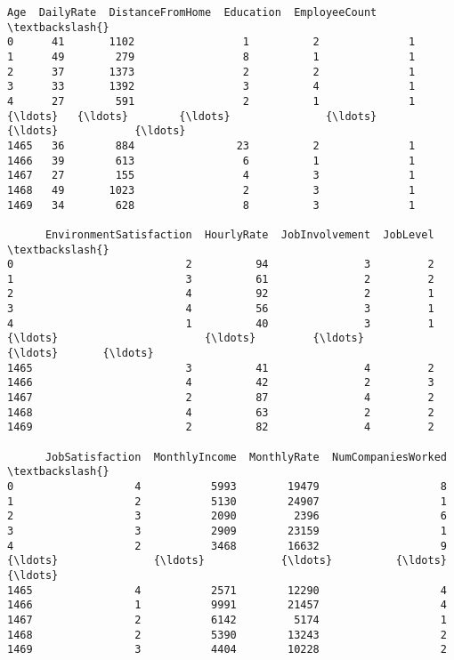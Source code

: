 \documentclass[11pt]{article}
\makeatletter
\newcommand{\boxspacing}{\kern\kvtcb@left@rule\kern\kvtcb@boxsep}
\newcommand{\prompt}[4]{
        {\ttfamily\llap{{\color{#2}[#3]:\hspace{3pt}#4}}\vspace{-\baselineskip}}
    }
\makeatother
\begin{document}
            \begin{tcolorbox}[breakable, size=fbox, boxrule=.5pt, pad at break*=1mm, opacityfill=0]
\prompt{Out}{outcolor}{3}{\boxspacing}
\begin{Verbatim}[commandchars=\\\{\}]
      Age  DailyRate  DistanceFromHome  Education  EmployeeCount  \textbackslash{}
0      41       1102                 1          2              1
1      49        279                 8          1              1
2      37       1373                 2          2              1
3      33       1392                 3          4              1
4      27        591                 2          1              1
{\ldots}   {\ldots}        {\ldots}               {\ldots}        {\ldots}            {\ldots}
1465   36        884                23          2              1
1466   39        613                 6          1              1
1467   27        155                 4          3              1
1468   49       1023                 2          3              1
1469   34        628                 8          3              1

      EnvironmentSatisfaction  HourlyRate  JobInvolvement  JobLevel  \textbackslash{}
0                           2          94               3         2
1                           3          61               2         2
2                           4          92               2         1
3                           4          56               3         1
4                           1          40               3         1
{\ldots}                       {\ldots}         {\ldots}             {\ldots}       {\ldots}
1465                        3          41               4         2
1466                        4          42               2         3
1467                        2          87               4         2
1468                        4          63               2         2
1469                        2          82               4         2

      JobSatisfaction  MonthlyIncome  MonthlyRate  NumCompaniesWorked  \textbackslash{}
0                   4           5993        19479                   8
1                   2           5130        24907                   1
2                   3           2090         2396                   6
3                   3           2909        23159                   1
4                   2           3468        16632                   9
{\ldots}               {\ldots}            {\ldots}          {\ldots}                 {\ldots}
1465                4           2571        12290                   4
1466                1           9991        21457                   4
1467                2           6142         5174                   1
1468                2           5390        13243                   2
1469                3           4404        10228                   2


\end{Verbatim}
\end{tcolorbox}
\end{document}
